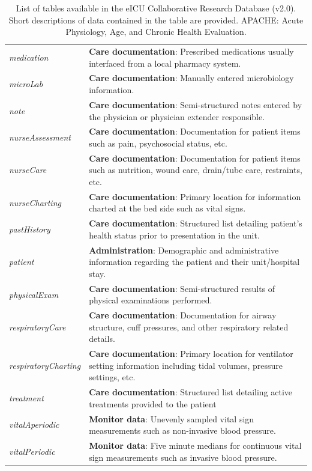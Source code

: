 \documentclass[english]{article}
\newcommand{\tblname}[1]{\emph{#1}}
\begin{document}
\begin{center}
\begin{table}
\begin{tabular}{p{4.4cm}|p{10.5cm}}
  \tblname{medication} &  \textbf{Care documentation}: Prescribed medications usually interfaced from a local pharmacy system. \\
  \tblname{microLab}   &  \textbf{Care documentation}: Manually entered microbiology information. \\
  \tblname{note}   &  \textbf{Care documentation}: Semi-structured notes entered by the physician or physician extender responsible. \\
  \tblname{nurseAssessment}   &  \textbf{Care documentation}: Documentation for patient items such as pain, psychosocial status, etc. \\
  \tblname{nurseCare}   &  \textbf{Care documentation}: Documentation for patient items such as nutrition, wound care, drain/tube care, restraints, etc. \\
  \tblname{nurseCharting} &  \textbf{Care documentation}: Primary location for information charted at the bed side such as vital signs. \\
  \tblname{pastHistory} &  \textbf{Care documentation}: Structured list detailing patient's health status prior to presentation in the unit.  \\
  \tblname{patient}  &  \textbf{Administration}: Demographic and administrative information regarding the patient and their unit/hospital stay.  \\
  \tblname{physicalExam}   &  \textbf{Care documentation}: Semi-structured results of physical examinations performed. \\
  \tblname{respiratoryCare}   &  \textbf{Care documentation}: Documentation for airway structure, cuff pressures, and other respiratory related details. \\
  \tblname{respiratoryCharting}   &  \textbf{Care documentation}: Primary location for ventilator setting information including tidal volumes, pressure settings, etc. \\
  \tblname{treatment} & \textbf{Care documentation}: Structured list detailing active treatments provided to the patient  \\
  \tblname{vitalAperiodic} & \textbf{Monitor data}: Unevenly sampled vital sign measurements such as non-invasive blood pressure.  \\
  \tblname{vitalPeriodic} & \textbf{Monitor data}: Five minute medians for continuous vital sign measurements such as invasive blood pressure.  \\
 \hline
 \end{tabular}
 \caption{List of tables available in the eICU Collaborative Research Database (v2.0). Short descriptions of data contained in the table are provided. APACHE: Acute Physiology, Age, and Chronic Health Evaluation.
 \label{tab:tables_available}}
\end{table}
\end{center}
\end{document}

